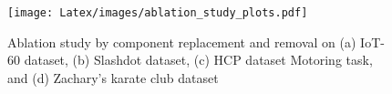 \begin{figure}[t]
\centering
\vspace{-.2cm}
\texttt{[image: Latex/images/ablation\_study\_plots.pdf]}
\caption{
\small Ablation study by component replacement and removal on (a) IoT-60 dataset, (b) Slashdot dataset, (c) HCP dataset Motoring task, and (d) Zachary's karate club dataset
}
\label{fig:ablation}
\end{figure}